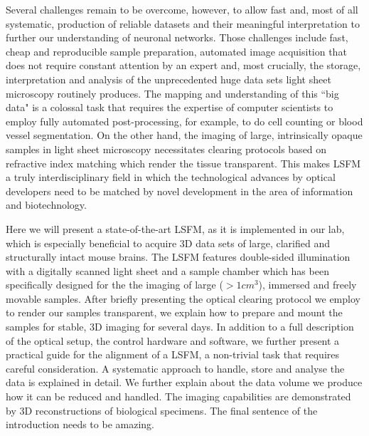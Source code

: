 \documentclass[12pt]{spieman}  %
\begin{document}
Several challenges remain to be overcome, however, to allow fast and, most of all systematic, production of reliable datasets and their meaningful interpretation to further our understanding of neuronal networks. Those challenges include fast, cheap and reproducible sample preparation, automated image acquisition that does not require constant attention by an expert and, most crucially, the storage, interpretation and analysis of the unprecedented huge data sets light sheet microscopy routinely produces. The mapping and understanding of this ``big data" is a colossal task that requires the expertise of computer scientists to employ fully automated post-processing, for example, to do cell counting or blood vessel segmentation. On the other hand, the imaging of large, intrinsically opaque samples in light sheet microscopy necessitates clearing protocols based on refractive index matching which render the tissue transparent. This makes LSFM a truly interdisciplinary field in which the technological advances by optical developers need to be matched by novel development in the area of information and biotechnology.

Here we will present a state-of-the-art LSFM, as it is implemented in our lab, which is especially beneficial to acquire 3D data sets of large, clarified and structurally intact mouse brains. The LSFM features double-sided illumination with a digitally scanned light sheet and a sample chamber which has been specifically designed for the the imaging of large ($> 1cm^3$), immersed and freely movable samples. After briefly presenting the optical clearing protocol we employ to render our samples transparent, we explain how to prepare and mount the samples for stable, 3D imaging for several days. In addition to a full description of the optical setup, the control hardware and software, we further present a practical guide for the alignment of a LSFM, a non-trivial task that requires careful consideration. A systematic approach to handle, store and analyse the data is explained in detail. We further explain about the data volume we produce how it can be reduced and handled. The imaging capabilities are demonstrated by 3D reconstructions of biological specimens.  The final sentence of the introduction needs to be amazing. 
\end{document}
